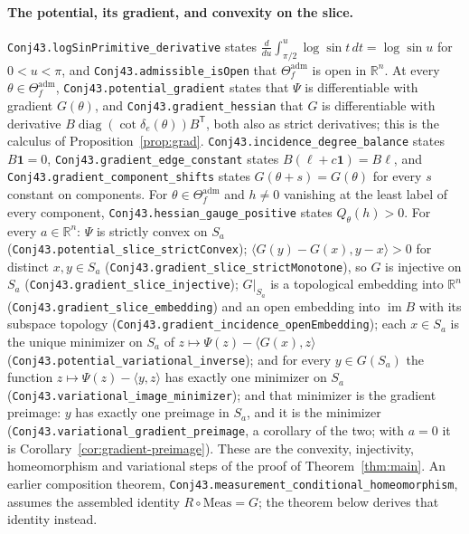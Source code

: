 \documentclass[11pt]{article}
\theoremstyle{definition}
\DeclareMathOperator{\im}{im}
\newcommand{\R}{\mathbb{R}}
\newcommand{\Theadm}{\Theta_f^{\mathrm{adm}}}
\begin{document}
\paragraph{The potential, its gradient, and convexity on the slice.}
\texttt{Conj43.\allowbreak logSinPrimitive\_\allowbreak derivative} states
$\frac{d}{du}\int_{\pi/2}^{u}\log\sin t\,dt=\log\sin u$ for $0<u<\pi$, and
\texttt{Conj43.\allowbreak admissible\_\allowbreak isOpen} that $\Theadm$ is open in $\R^n$. At every $\theta\in\Theadm$,
\texttt{Conj43.\allowbreak potential\_\allowbreak gradient} states that $\Psi$ is differentiable with gradient $G(\theta)$, and
\texttt{Conj43.\allowbreak gradient\_\allowbreak hessian} that $G$ is differentiable with derivative
$B\operatorname{diag}(\cot\delta_e(\theta))B^{\mathsf T}$, both also as strict derivatives; this is the
calculus of Proposition~\ref{prop:grad}. \texttt{Conj43.\allowbreak incidence\_\allowbreak degree\_\allowbreak balance} states $B\mathbf1=0$,
\texttt{Conj43.\allowbreak gradient\_\allowbreak edge\_\allowbreak constant} states $B(\ell+c\mathbf1)=B\ell$, and
\texttt{Conj43.\allowbreak gradient\_\allowbreak component\_\allowbreak shifts} states $G(\theta+s)=G(\theta)$ for every $s$ constant on
components. For $\theta\in\Theadm$ and $h\ne0$ vanishing at the least label of every component,
\texttt{Conj43.\allowbreak hessian\_\allowbreak gauge\_\allowbreak positive} states $Q_\theta(h)>0$. For every $a\in\R^n$: $\Psi$ is strictly
convex on $S_a$ (\texttt{Conj43.\allowbreak potential\_\allowbreak slice\_\allowbreak strictConvex}); $\langle G(y)-G(x),y-x\rangle>0$ for
distinct $x,y\in S_a$ (\texttt{Conj43.\allowbreak gradient\_\allowbreak slice\_\allowbreak strictMonotone}), so $G$ is injective on $S_a$
(\texttt{Conj43.\allowbreak gradient\_\allowbreak slice\_\allowbreak injective}); $G|_{S_a}$ is a topological embedding into $\R^n$
(\texttt{Conj43.\allowbreak gradient\_\allowbreak slice\_\allowbreak embedding}) and an open embedding into $\im B$ with its subspace
topology (\texttt{Conj43.\allowbreak gradient\_\allowbreak incidence\_\allowbreak openEmbedding}); each $x\in S_a$ is the unique minimizer on
$S_a$ of $z\mapsto\Psi(z)-\langle G(x),z\rangle$ (\texttt{Conj43.\allowbreak potential\_\allowbreak variational\_\allowbreak inverse}); and
for every $y\in G(S_a)$ the function $z\mapsto\Psi(z)-\langle y,z\rangle$ has exactly one minimizer on
$S_a$ (\texttt{Conj43.\allowbreak variational\_\allowbreak image\_\allowbreak minimizer}); and that minimizer is the
gradient preimage: $y$ has exactly one preimage in $S_a$, and it is the minimizer
(\texttt{Conj43.\allowbreak variational\_\allowbreak gradient\_\allowbreak preimage}, a corollary of the two;
with $a=0$ it is Corollary~\ref{cor:gradient-preimage}). These are the convexity, injectivity,
homeomorphism and variational steps of the proof of Theorem~\ref{thm:main}. An earlier composition
theorem, \texttt{Conj43.\allowbreak measurement\_\allowbreak conditional\_\allowbreak homeomorphism}, assumes the assembled identity
$R\circ\mathrm{Meas}=G$; the theorem below derives that identity instead.
\end{document}
